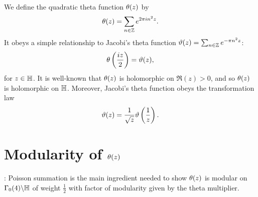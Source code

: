 \documentclass[12pt,reqno,oneside]{amsart}
\begin{document}
    We define the quadratic theta function $\theta(z)$ by
    \[
        \theta(z) = \sum_{n \in \mathbb{Z}}e^{2\pi in^{2}z}.
    \]
    It obeys a simple relationship to Jacobi's theta function $\vartheta(z) = \sum_{n \in \mathbb{Z}}e^{-\pi n^{2}z}$:
    \begin{equation}\label{equ:Jacobi_theta_relation}
        \theta\left(\frac{iz}{2}\right) = \vartheta(z),
    \end{equation}
    for $z \in \mathbb{H}$. It is well-known that $\theta(z)$ is holomorphic on $\Re(z) > 0$, and so $\theta(z)$ is holomorphic on $\mathbb{H}$. Moreover, Jacobi's theta function obeys the transformation law
    \begin{equation}\label{equ:Jacobi_transformation_law}
        \vartheta(z) = \frac{1}{\sqrt{z}}\vartheta\left(\frac{1}{z}\right).
    \end{equation}
\section{Modularity of \texorpdfstring{$\theta(z)$}{t(z)}}:
    Poisson summation is the main ingredient needed to show $\theta(z)$ is modular on $\Gamma_{0}(4)\backslash\mathbb{H}$ of weight $\frac{1}{2}$ with factor of modularity given by the theta multiplier.
\end{document}
